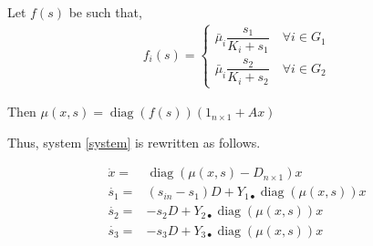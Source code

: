 \documentclass[3p,times]{article}
\newcommand{\R}{\mathbb{R}}
\DeclareMathOperator{\diag}{diag}
\begin{document}
Let $f(s)$ be such that,
%
\begin{align}
f_i(s) = \begin{cases}
\bar{\mu}_i \dfrac{s_1}{K_i + s_1} \quad \forall i \in G_1 \\
\bar{\mu}_i \dfrac{s_2}{K_i + s_2} \quad \forall i \in G_2
\end{cases}
\end{align}

Then $\mu(x,s) = \diag(f(s))(1_{n\times 1} + Ax)$

Thus, system \eqref{system} is rewritten as follows. 

\begin{align}
\label{Eq1}	\dot{x} = & \diag(\mu(x,s) - D_{n\times 1})x \\
\label{Eq2}	\dot{s_1} = & (s_{in}-s_1)D + Y_{1\bullet} \diag(\mu(x,s))x \\
\label{Eq3}	\dot{s_2} = & -s_2D+
Y_{2\bullet} \diag(\mu(x,s))x\\	
\label{Eq4}	\dot{s_3} = & -s_3D+Y_{3\bullet} \diag(\mu(x,s))x 
\end{align} 
\end{document}
